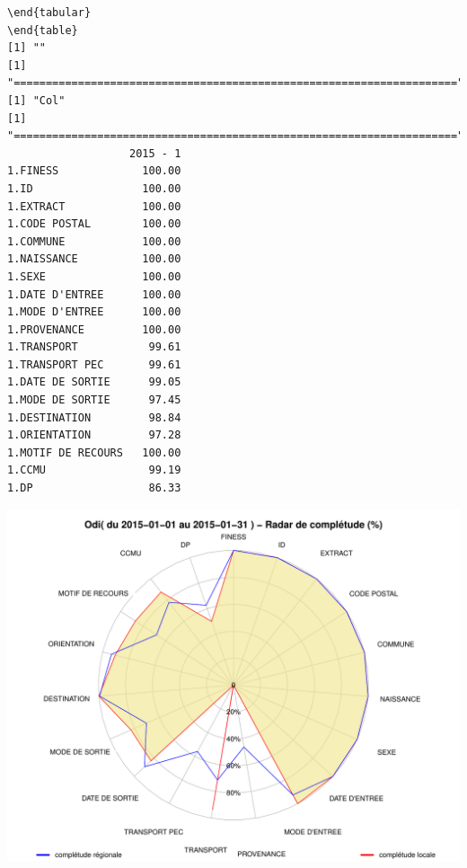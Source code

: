 \documentclass[]{article}
\begin{document}
\begin{verbatim}
\end{tabular} 
\end{table} 
[1] ""
[1] "====================================================================="
[1] "Col"
[1] "====================================================================="
                   2015 - 1
1.FINESS             100.00
1.ID                 100.00
1.EXTRACT            100.00
1.CODE POSTAL        100.00
1.COMMUNE            100.00
1.NAISSANCE          100.00
1.SEXE               100.00
1.DATE D'ENTREE      100.00
1.MODE D'ENTREE      100.00
1.PROVENANCE         100.00
1.TRANSPORT           99.61
1.TRANSPORT PEC       99.61
1.DATE DE SORTIE      99.05
1.MODE DE SORTIE      97.45
1.DESTINATION         98.84
1.ORIENTATION         97.28
1.MOTIF DE RECOURS   100.00
1.CCMU                99.19
1.DP                  86.33
\end{verbatim}

\includegraphics{completude_files/figure-latex/finess-14.pdf}
\end{document}
